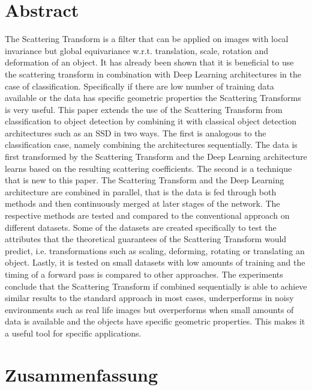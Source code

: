 \chapter*{Abstract}
\label{chap:abstract}

The Scattering Transform is a filter that can be applied on images with local invariance but global equivariance w.r.t. translation, scale, rotation and deformation of an object. It has already been shown that it is beneficial to use the scattering transform in combination with Deep Learning architectures in the case of classification. Specifically if there are low number of training data available or the data has specific geometric properties the Scattering Transforms is very useful. This paper extends the use of the Scattering Transform from classification to object detection by combining it with classical object detection architectures such as an SSD in two ways. The first is analogous to the classification case, namely combining the architectures sequentially. The data is first transformed by the Scattering Transform and the Deep Learning architecture learns based on the resulting scattering coefficients. The second is a technique that is new to this paper. The Scattering Transform and the Deep Learning architecture are combined in parallel, that is the data is fed through both methods and then continuously merged at later stages of the network. The respective methods are tested and compared to the conventional approach on different datasets. Some of the datasets are created specifically to test the attributes that the theoretical guarantees of the Scattering Transform would predict, i.e. transformations such as scaling, deforming, rotating or translating an object. Lastly, it is tested on small datasets with low amounts of training and the timing of a forward pass is compared to other approaches. The experiments conclude that the Scattering Transform if combined sequentially is able to achieve similar results to the standard approach in most cases, underperforms in noisy environments such as real life images but overperforms when small amounts of data is available and the objects have specific geometric properties. This makes it a useful tool for specific applications.

\chapter*{Zusammenfassung}
\label{chap:zusammenfassung}

